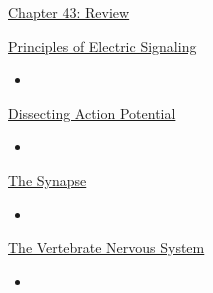 \documentclass[12pt,letterpaper]{article}
\begin{document}
\hypertarget{43.r}{}
\begin{probbox}{\hyperlink{43}{Chapter 43: Review}}\end{probbox}
    \hyperlink{43.1}{Principles of Electric Signaling}
    \begin{itemize}
        \item
    \end{itemize}
    \hyperlink{43.2}{Dissecting Action Potential}
    \begin{itemize}
        \item      
    \end{itemize}
    \hyperlink{43.3}{The Synapse}
    \begin{itemize}
        \item
    \end{itemize}
    \hyperlink{43.4}{The Vertebrate Nervous System}
    \begin{itemize}
        \item
    \end{itemize}

\end{document}
